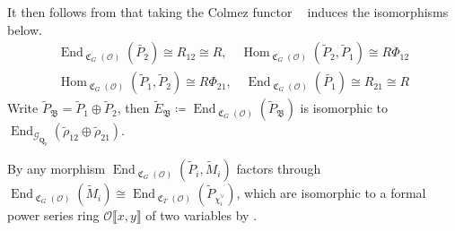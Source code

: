 \documentclass[leqno]{amsart}
\theoremstyle{definition}
\theoremstyle{remark}
\newcommand{\oo}{\mathcal{O}}
\newcommand{\Qp}{\mathbf{Q}_p}
\DeclareMathOperator{\End}{End}
\DeclareMathOperator{\Hom}{Hom}
\DeclareMathOperator{\fC}{\mathfrak{C}} %
\DeclareMathOperator{\V}{\check{\mathbf{V}}} %
\newcommand{\Gp}{\mathcal{G}_{\Qp}} %
\newcommand{\B}{\mathfrak B} %
\begin{document}
It then follows from \cite[Lem 8.10]{pask} that 
taking the Colmez functor 
$\V$ induces the isomorphisms below.
\begin{equation}\label{eq:end_deform}
\begin{split}
	\End_{\fC_{G}(\oo)}(\tilde{P_2})\cong R_{12}\cong R,\quad
	\Hom_{\fC_G(\oo)}(\tilde{P}_2, \tilde{P}_1)\cong R\Phi_{12}\\
	\Hom_{\fC_G(\oo)}(\tilde{P}_1, \tilde{P}_2)\cong R\Phi_{21},\quad
	\End_{\fC_{G}(\oo)}(\tilde{P_1})\cong R_{21}\cong R
\end{split}
\end{equation}
Write $ \tilde{P}_\B=\tilde{P}_1\oplus \tilde{P}_2$,
then $\tilde{E}_\B\coloneqq
\End_{\fC_G(\oo)}(\tilde{P}_\B)$
is isomorphic to 
$\End_{\Gp}(\tilde{\rho}_{12}\oplus \tilde{\rho}_{21})$.



By \cite[Prop 7.1]{pask}
any morphism 
$\End_{\fC_G(\oo)}(\tilde{P}_i, \tilde{M}_i)$
factors through
$\End_{\fC_G(\oo)}(\tilde{M}_i)\cong
\End_{\fC_T(\oo)}(\tilde{P}_{\chi_i^\vee})$,
which are isomorphic to
a formal power series ring
$ \oo\llbracket x,y\rrbracket$
of two variables
by \cite[Prop 3.34]{pask}.
\end{document}
